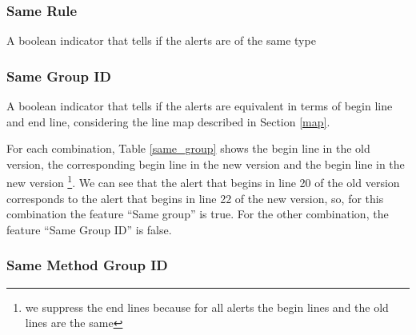 \documentclass[
]{article}
\begin{document}
\subsubsection{Same Rule}

A boolean indicator that tells if the alerts are of the same type

\subsubsection{Same Group ID}\label{same_group_id}

A boolean indicator that tells if the alerts are equivalent in terms of
begin line and end line, considering the line map described in Section
\ref{map}.

For each combination, Table \ref{same_group} shows the begin line in the
old version, the corresponding begin line in the new version and the
begin line in the new version
\footnote{we suppress the end lines because for all alerts the begin lines and the old lines are the same}.
We can see that the alert that begins in line 20 of the old version
corresponds to the alert that begins in line 22 of the new version, so,
for this combination the feature ``Same group'' is true. For the other
combination, the feature ``Same Group ID'' is false.

\small

\begin{table}[H]

\caption{\label{tab:unnamed-chunk-7}Same group feature \label{same_group}}
\centering
{}
\end{table}

\normalsize

\subsubsection {Same Method Group ID} \label{same_method_group_id}
\end{document}
